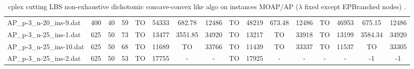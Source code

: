 \begin{sidewaystable}[!ht]
{\begin{tabular}{lccccccccccccccc}
AP\_p-3\_n-20\_ins-9.dat & 400 & 40 & 59 &  TO & 54333 & 682.78 & 12486 &  TO & 48219 &  \textcolor{blue2}{673.48} & 12486 &  TO & 46953 & 675.15 & 12486 \\
AP\_p-3\_n-25\_ins-1.dat & 625 & 50 & 73 &  TO & 13477 &  \textcolor{blue2}{3551.85} & 34920 &  TO & 13217 &  TO & 33918 &  TO & 13199 & 3584.34 & 34920 \\
AP\_p-3\_n-25\_ins-10.dat & 625 & 50 & 68 &  TO & 11689 &  TO & 33766 &  TO & 11439 &  TO & 33337 &  TO & 11537 &  TO & 33305 \\
AP\_p-3\_n-25\_ins-2.dat & 625 & 50 & 53 &  TO & 17755 &  - &  - &  TO & 17925 &  - &  - &  - &  - & -1 & -1 \\
\bottomrule
\end{tabular}
}%
\caption{cplex cutting LBS non-exhaustive dichotomic concave-convex like algo on instances MOAP/AP ($\lambda$ fixed except EPBranched nodes) .}
\end{sidewaystable}
